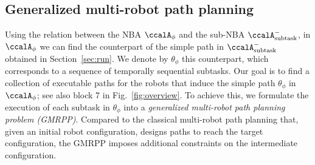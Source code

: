 \documentclass[Afour,sageh,times]{sagej}
\newcommand{\auto}[1]{\ccalA_{\textup{#1}}}
\newcommand{\autop}{\ccalA_{\phi}}
\begin{document}
 {\subsection{Generalized multi-robot path planning}\label{sec:mapp}
 Using the relation between the NBA  $\autop$ and the sub-NBA $\auto{subtask}^-$, in $\autop$ we can find the counterpart of the simple path in $\auto{subtask}^-$ obtained in Section~\ref{sec:run}. We denote by $\theta_{\phi}$ this counterpart, which corresponds to a sequence of temporally sequential subtasks. Our goal is to find a collection of executable paths for the robots that induce the simple path $\theta_{\phi}$ in $\autop$; see also block 7 in Fig.~\ref{fig:overview}. To achieve this, we formulate the execution of each subtask in $\theta_{\phi}$ into a {\it generalized multi-robot path planning problem (GMRPP)}. Compared to the classical multi-robot path planning that, given an initial robot configuration, designs paths to reach the target configuration, the GMRPP imposes additional constraints on the intermediate configuration.



}
\end{document}
